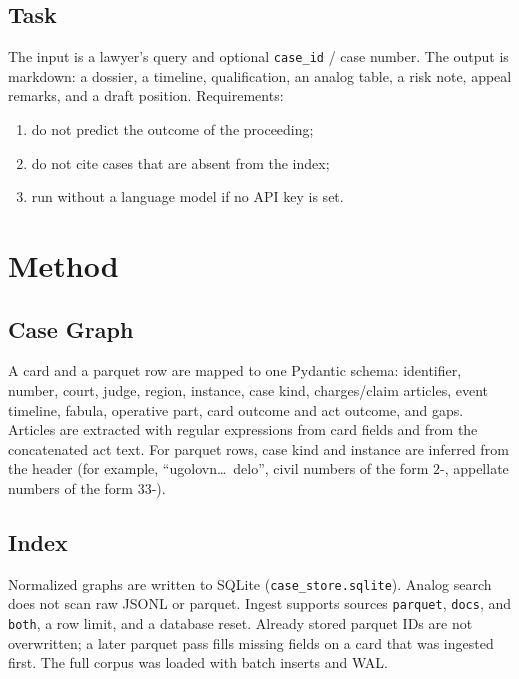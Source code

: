 \documentclass[preprint,12pt]{elsarticle}
\begin{document}
\subsection{Task}

The input is a lawyer's query and optional \texttt{case\_id} / case number. The output is markdown: a dossier, a timeline, qualification, an analog table, a risk note, appeal remarks, and a draft position. Requirements:

\begin{enumerate}
\item do not predict the outcome of the proceeding;
\item do not cite cases that are absent from the index;
\item run without a language model if no API key is set.
\end{enumerate}

\section{Method}

\subsection{Case Graph}
\label{sec:casegraph}

A card and a parquet row are mapped to one Pydantic schema: identifier, number, court, judge, region, instance, case kind, charges/claim articles, event timeline, fabula, operative part, card outcome and act outcome, and gaps. Articles are extracted with regular expressions from card fields and from the concatenated act text. For parquet rows, case kind and instance are inferred from the header (for example, ``ugolovn\ldots\ delo'', civil numbers of the form $2$-, appellate numbers of the form $33$-).

\subsection{Index}

Normalized graphs are written to SQLite (\texttt{case\_store.sqlite}). Analog search does not scan raw JSONL or parquet. Ingest supports sources \texttt{parquet}, \texttt{docs}, and \texttt{both}, a row limit, and a database reset. Already stored parquet IDs are not overwritten; a later parquet pass fills missing fields on a card that was ingested first. The full corpus was loaded with batch inserts and WAL.
\end{document}
